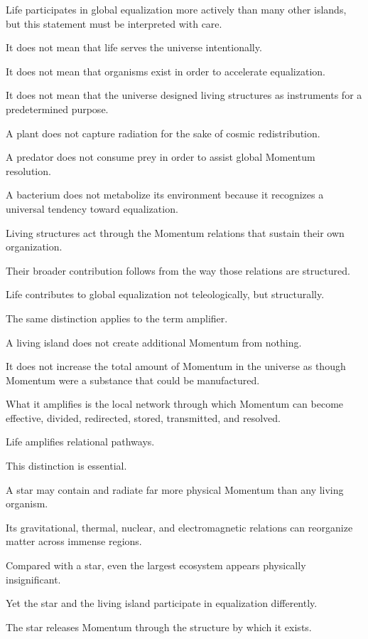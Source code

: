 Life participates in global equalization more actively than many other islands, but this statement must be interpreted with care.

It does not mean that life serves the universe intentionally.

It does not mean that organisms exist in order to accelerate equalization.

It does not mean that the universe designed living structures as instruments for a predetermined purpose.

A plant does not capture radiation for the sake of cosmic redistribution.

A predator does not consume prey in order to assist global Momentum resolution.

A bacterium does not metabolize its environment because it recognizes a universal tendency toward equalization.

Living structures act through the Momentum relations that sustain their own organization.

Their broader contribution follows from the way those relations are structured.

Life contributes to global equalization not teleologically, but structurally.

The same distinction applies to the term amplifier.

A living island does not create additional Momentum from nothing.

It does not increase the total amount of Momentum in the universe as though Momentum were a substance that could be manufactured.

What it amplifies is the local network through which Momentum can become effective, divided, redirected, stored, transmitted, and resolved.

Life amplifies relational pathways.

This distinction is essential.

A star may contain and radiate far more physical Momentum than any living organism.

Its gravitational, thermal, nuclear, and electromagnetic relations can reorganize matter across immense regions.

Compared with a star, even the largest ecosystem appears physically insignificant.

Yet the star and the living island participate in equalization differently.

The star releases Momentum through the structure by which it exists.

